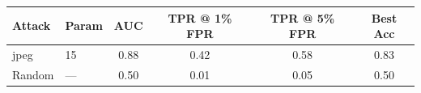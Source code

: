 \begin{tabular}{llcccc}
\toprule
Attack & Param & AUC & TPR @ 1\% FPR & TPR @ 5\% FPR & Best Acc \\
\midrule
jpeg & 15 & 0.88 & 0.42 & 0.58 & 0.83 \\
Random & — & 0.50 & 0.01 & 0.05 & 0.50 \\
\bottomrule
\end{tabular}

